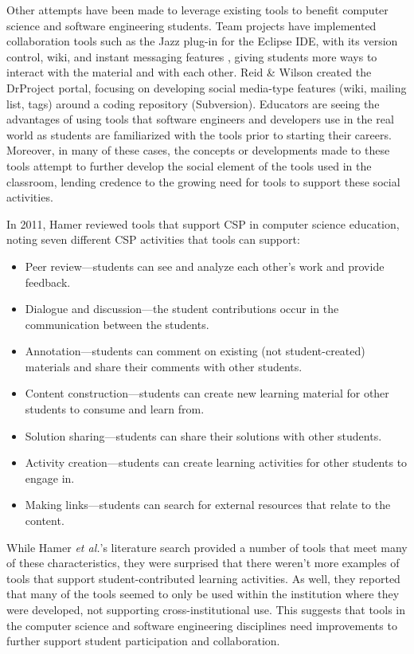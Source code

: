 Other attempts have been made to leverage existing tools to benefit computer science and software engineering students. Team projects have implemented collaboration tools such as the Jazz plug-in for the Eclipse IDE, with its version control, wiki, and instant messaging features \cite{meneely2009preparing}, giving students more ways to interact with the material and with each other. Reid \& Wilson \cite{reid2007drproject}  created the DrProject portal, focusing on developing social media-type features (wiki, mailing list, tags) around a coding repository (Subversion). Educators are seeing the advantages of using tools that software engineers and developers use in the real world as students are familiarized with the tools prior to starting their careers. Moreover, in many of these cases, the concepts or developments made to these tools attempt to further develop the social element of the tools used in the classroom, lending credence to the growing need for tools to support these social activities.

In 2011, Hamer \cite{hamer2011tools} reviewed tools that support CSP in computer science education, noting seven different CSP activities that tools can support:
\begin{itemize}
\item Peer review---students can see and analyze each other's work and provide feedback.
\item Dialogue and discussion---the student contributions occur in the communication between the students.
\item Annotation---students can comment on existing (not student-created) materials and share their comments with other students.
\item Content construction---students can create new learning material for other students to consume and learn from.
\item Solution sharing---students can share their solutions with other students.
\item Activity creation---students can create learning activities for other students to engage in.
\item Making links---students can search for external resources that relate to the content.
\end{itemize}

While Hamer \textit{et al.}'s literature search provided a number of tools that meet many of these characteristics, they were surprised that there weren't more examples of tools that support student-contributed learning activities. As well, they reported that many of the tools seemed to only be used within the institution where they were developed, not supporting cross-institutional use. This suggests that tools in the computer science and software engineering disciplines need improvements to further support student participation and collaboration.

